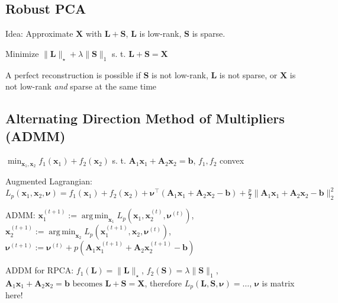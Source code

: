 \documentclass[a4paper, 11pt, landscape]{article}
\DeclareMathOperator*{\argmin}{arg\,min}
\begin{document}
\begin{multicols*}{3}
\section{Robust PCA}
\begin{compactitem}
	\item Idea: Approximate $\mathbf{X}$ with $\mathbf{L} + \mathbf{S}$, $\mathbf{L}$ is low-rank, $\mathbf{S}$ is sparse.
	\item Minimize $\|\mathbf{L}\|_\star + \lambda \|\mathbf{S}\|_1$ s. t. $\mathbf{L} + \mathbf{S} = \mathbf{X}$
	\item A perfect reconstruction is possible if $\mathbf{S}$ is not low-rank, $\mathbf{L}$ is not sparse, or $\mathbf{X}$ is not low-rank \textit{and} sparse at the same time
\end{compactitem}

\subsection{Alternating Direction Method of Multipliers (ADMM)}
$\min_{\mathbf{x}_1, \mathbf{x}_2} f_1(\mathbf{x}_1) + f_2(\mathbf{x}_2)$ s. t. $\mathbf{A}_1 \mathbf{x}_1 + \mathbf{A}_2 \mathbf{x}_2 = \mathbf{b}$, $f_1, f_2$ convex
\begin{inparaitem}[\color{red}\textbullet]
	\item Augmented Lagrangian: $L_p(\mathbf{x}_1, \mathbf{x}_2, \boldsymbol{\nu}) = f_1(\mathbf{x}_1) + f_2(\mathbf{x}_2) + \boldsymbol{\nu}^\top (\mathbf{A}_1 \mathbf{x}_1 + \mathbf{A}_2 \mathbf{x}_2 - \mathbf{b}) + \frac{p}{2}\| \mathbf{A}_1 \mathbf{x}_1 + \mathbf{A}_2 \mathbf{x}_2 - \mathbf{b} \|_2^2$
	\item ADMM: $\mathbf{x}_1^{(t+1)} := \argmin_{\mathbf{x}_1} L_p(\mathbf{x}_1, \mathbf{x}_2^{(t)}, \boldsymbol{\nu}^{(t)})$, $\mathbf{x}_2^{(t+1)} := \argmin_{\mathbf{x}_2} L_p(\mathbf{x}_1^{(t+1)}, \mathbf{x}_2, \boldsymbol{\nu}^{(t)})$, $\boldsymbol{\nu}^{(t+1)} := \boldsymbol{\nu}^{(t)} + p(\mathbf{A}_1 \mathbf{x}_1^{(t+1)} + \mathbf{A}_2 \mathbf{x}_2^{(t+1)} - \mathbf{b})$
	\item ADDM for RPCA: $f_1(\mathbf{L}) = \|\mathbf{L}\|_\star$, $f_2(\mathbf{S}) = \lambda \| \mathbf{S} \|_1$, $\mathbf{A}_1 \mathbf{x}_1 + \mathbf{A}_2 \mathbf{x}_2 = \mathbf{b} \text{ becomes } \mathbf{L} + \mathbf{S} = \mathbf{X}$, therefore $L_p(\mathbf{L}, \mathbf{S}, \boldsymbol{\nu}) = \ldots$, $\boldsymbol{\nu}$ is matrix here!
\end{inparaitem}




\raggedcolumns
\end{multicols*}
\end{document}
